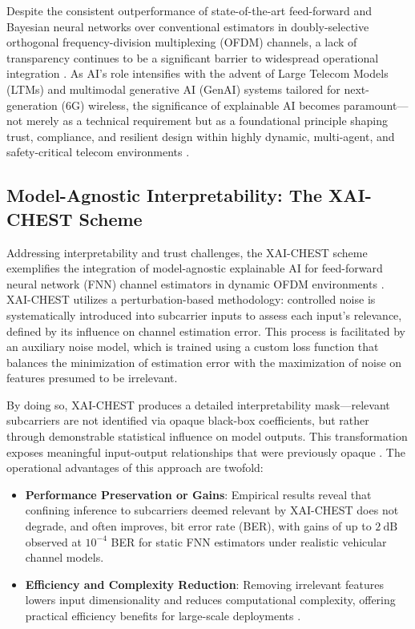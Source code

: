 Despite the consistent outperformance of state-of-the-art feed-forward and Bayesian neural networks over conventional estimators in doubly-selective orthogonal frequency-division multiplexing (OFDM) channels, a lack of transparency continues to be a significant barrier to widespread operational integration \cite{ref38}. As AI's role intensifies with the advent of Large Telecom Models (LTMs) and multimodal generative AI (GenAI) systems tailored for next-generation (6G) wireless, the significance of explainable AI becomes paramount—not merely as a technical requirement but as a foundational principle shaping trust, compliance, and resilient design within highly dynamic, multi-agent, and safety-critical telecom environments \cite{ref41}.

\subsection{Model-Agnostic Interpretability: The XAI-CHEST Scheme}

Addressing interpretability and trust challenges, the XAI-CHEST scheme exemplifies the integration of model-agnostic explainable AI for feed-forward neural network (FNN) channel estimators in dynamic OFDM environments \cite{ref38,ref41}. XAI-CHEST utilizes a perturbation-based methodology: controlled noise is systematically introduced into subcarrier inputs to assess each input’s relevance, defined by its influence on channel estimation error. This process is facilitated by an auxiliary noise model, which is trained using a custom loss function that balances the minimization of estimation error with the maximization of noise on features presumed to be irrelevant. 

By doing so, XAI-CHEST produces a detailed interpretability mask—relevant subcarriers are not identified via opaque black-box coefficients, but rather through demonstrable statistical influence on model outputs. This transformation exposes meaningful input-output relationships that were previously opaque \cite{ref41}. The operational advantages of this approach are twofold:

\begin{itemize}
    \item \textbf{Performance Preservation or Gains}: Empirical results reveal that confining inference to subcarriers deemed relevant by XAI-CHEST does not degrade, and often improves, bit error rate (BER), with gains of up to \(2~\mathrm{dB}\) observed at \(10^{-4}\) BER for static FNN estimators under realistic vehicular channel models.
    \item \textbf{Efficiency and Complexity Reduction}: Removing irrelevant features lowers input dimensionality and reduces computational complexity, offering practical efficiency benefits for large-scale deployments \cite{ref41}.
\end{itemize}

